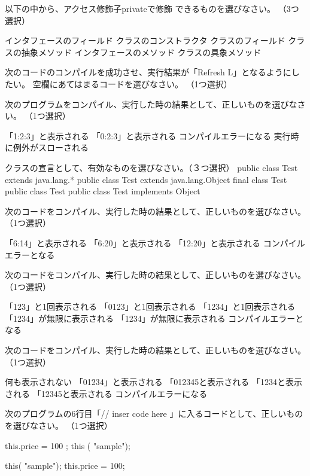 \documentclass[12pt]{article}
\begin{document}
以下の中から、アクセス修飾子privateで修飾
できるものを選びなさい。
（3つ選択）

インタフェースのフィールド
クラスのコンストラクタ
クラスのフィールド
クラスの抽象メソッド
インタフェースのメソッド
クラスの具象メソッド

次のコードのコンパイルを成功させ、実行結果が「Refresh L」となるようにしたい。
空欄にあてはまるコードを選びなさい。
（1つ選択）





次のプログラムをコンパイル、実行した時の結果として、正しいものを選びなさい。
（1つ選択）


「1:2:3」と表示される
「0:2:3」と表示される
コンパイルエラーになる
実行時に例外がスローされる

クラスの宣言として、有効なものを選びなさい。（３つ選択）
public class Test extends java.lang.* { }
public class Test extends java.lang.Object{}
final class Test{}
public class Test{}
public class Test implements Object{}

次のコードをコンパイル、実行した時の結果として、正しいものを選びなさい。
（1つ選択）


「6:14」と表示される
「6:20」と表示される
「12:20」と表示される
コンパイルエラーとなる


次のコードをコンパイル、実行した時の結果として、正しいものを選びなさい。（1つ選択）

「123」と1回表示される
「0123」と1回表示される
「1234」と1回表示される
「1234」が無限に表示される
「1234」が無限に表示される
コンパイルエラーとなる


次のコードをコンパイル、実行した時の結果として、正しいものを選びなさい。（1つ選択）


何も表示されない
「01234」と表示される
「012345と表示される
「1234と表示される
「12345と表示される
コンパイルエラーになる


次のプログラムの6行目「// inser code here 」に入るコードとして、正しいものを選びなさい。
（1つ選択）


this.price = 100 ;
this ( "sample");

this( "sample");
this.price = 100;
\end{document}
